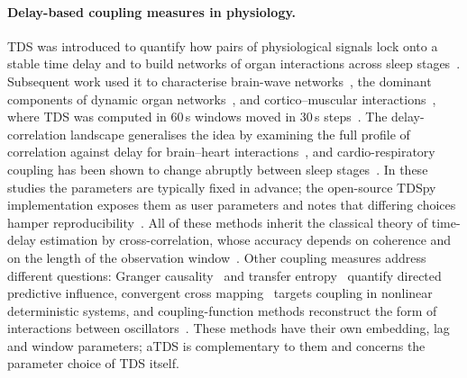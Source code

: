 \documentclass[11pt,a4paper]{article}
\begin{document}
\paragraph{Delay-based coupling measures in physiology.}
TDS was introduced to quantify how pairs of physiological signals lock onto a stable time delay and to build networks of organ interactions across sleep stages~\cite{Bashan2012NetworkPhysiology,Bartsch2015NetworkPhysiology}. Subsequent work used it to characterise brain-wave networks~\cite{Liu2015PlasticityBrain}, the dominant components of dynamic organ networks~\cite{Liu2015MajorComponent}, and cortico--muscular interactions~\cite{Rizzo2020NetworkPhysiology,Rizzo2022DynamicNetworks}, where TDS was computed in 60\,s windows moved in 30\,s steps~\cite{Rizzo2020NetworkPhysiology}. The delay-correlation landscape generalises the idea by examining the full profile of correlation against delay for brain--heart interactions~\cite{Lin2016DelaycorrelationLandscape}, and cardio-respiratory coupling has been shown to change abruptly between sleep stages~\cite{Bartsch2012PhaseTransitions}. In these studies the parameters are typically fixed in advance; the open-source TDSpy implementation exposes them as user parameters and notes that differing choices hamper reproducibility~\cite{Steinbrinker2024TdspyOpensource}. All of these methods inherit the classical theory of time-delay estimation by cross-correlation, whose accuracy depends on coherence and on the length of the observation window~\cite{Knapp1976GeneralizedCorrelation,Carter1987CoherenceTime}. Other coupling measures address different questions: Granger causality~\cite{Granger1969InvestigatingCausal} and transfer entropy~\cite{Schreiber2000MeasuringInformation} quantify directed predictive influence, convergent cross mapping~\cite{Sugihara2012DetectingCausality} targets coupling in nonlinear deterministic systems, and coupling-function methods reconstruct the form of interactions between oscillators~\cite{Stankovski2017CouplingFunctions}. These methods have their own embedding, lag and window parameters; aTDS is complementary to them and concerns the parameter choice of TDS itself.
\end{document}
